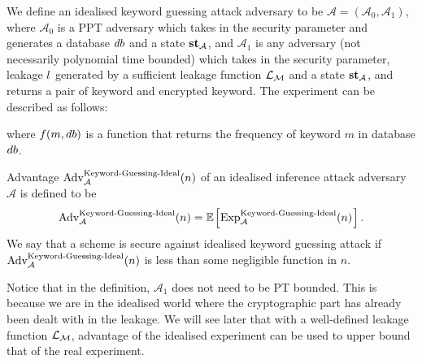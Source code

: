 \begin{definition}
We define an idealised keyword guessing attack adversary to be $\mathcal{A} = (\mathcal{A}_0, \mathcal{A}_1)$, where $\mathcal{A}_0$ is a PPT adversary which takes in the security parameter and generates  a database $db$ and a state $\textbf{st}_{\mathcal{A}}$, and $\mathcal{A}_1$ is any adversary (not necessarily polynomial time bounded) which takes in the security parameter, leakage $l$ generated by a sufficient leakage function $\mathcal{L}_\mathcal{M}$ and a state $\textbf{st}_{\mathcal{A}}$, and returns a pair of keyword and encrypted keyword. The experiment can be described as follows:
\begin{pchstack}[center]
\end{pchstack}
where $f(m, db)$ is a function that returns the frequency of keyword $m$ in database $db$.

Advantage $\text{Adv}_{\mathcal{A}}^{\text{Keyword-Guessing-Ideal}}(n)$ of an idealised inference attack adversary $\mathcal{A}$ is defined to be
\begin{equation}
\advantage_{\mathcal{A}}^{\text{Keyword-Guessing-Ideal}}(n) = \expect{\text{Exp}_{\adv}^{\text{Keyword-Guessing-Ideal}}(n)}.
\end{equation}
We say that a scheme is secure against idealised keyword guessing attack if $\text{Adv}_{\mathcal{A}}^{\text{Keyword-Guessing-Ideal}}(n)$ is less than some negligible function in $n$.
\end{definition}

Notice that in the definition, $\mathcal{A}_1$ does not need to be PT bounded. This is because we are in the idealised world where the cryptographic part has already been dealt with in the leakage. We will see later that with a well-defined leakage function $\mathcal{L}_\mathcal{M}$, advantage of the idealised experiment can be used to upper bound that of the real experiment.




